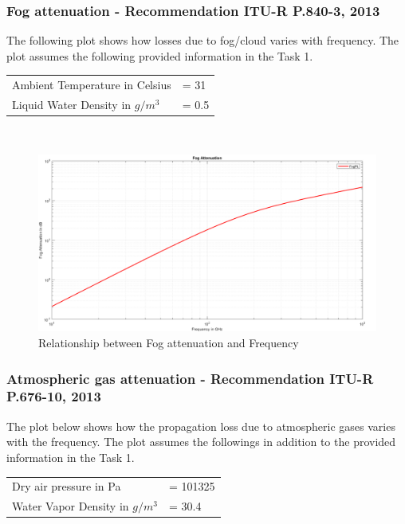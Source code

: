 \documentclass[a4paper,11pt]{article}%
\begin{document}
\subsubsection{Fog attenuation - Recommendation ITU-R P.840-3, 2013}
The following plot shows how losses due to fog/cloud varies with frequency. The plot assumes the following provided information in the Task 1.\\

\begin{tabular}{l l}
	Ambient Temperature in Celsius&= 31\\
	Liquid Water Density in $g/m^3$&= 0.5\\
\end{tabular}\\

\begin{figure}[!h]
	\centering
	\includegraphics[scale=0.35]{figures/fpl}
	\caption{Relationship between Fog attenuation  and Frequency}
\end{figure}

\subsubsection{Atmospheric gas attenuation - Recommendation ITU-R P.676-10, 2013}

The plot below shows how the propagation loss due to atmospheric gases varies with the frequency. The plot assumes the followings in addition to the provided information in the Task 1.

\begin{tabular}{l l}
	 Dry air pressure in Pa&= 101325\\
	 Water Vapor Density in $g/m^3$&= 30.4\\
\end{tabular}
\end{document}
